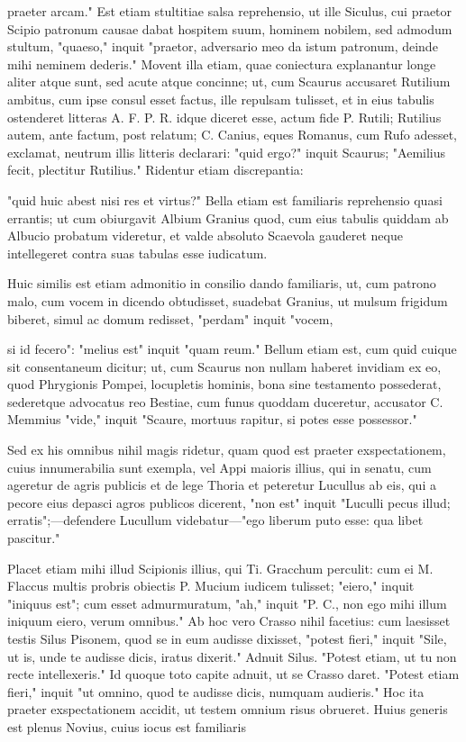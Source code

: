  praeter arcam." Est etiam stultitiae salsa reprehensio, ut ille Siculus, cui praetor Scipio patronum causae dabat hospitem suum, hominem nobilem, sed admodum stultum, "quaeso," inquit "praetor, adversario meo da istum patronum, deinde mihi neminem dederis." Movent illa etiam, quae coniectura explanantur longe aliter atque sunt, sed acute atque concinne; ut, cum Scaurus accusaret Rutilium ambitus, cum ipse consul esset factus, ille repulsam tulisset, et in eius tabulis ostenderet litteras A. F. P. R. idque diceret esse, actum fide P. Rutili; Rutilius autem, ante factum, post relatum; C. Canius, eques Romanus, cum Rufo adesset, exclamat, neutrum illis litteris declarari: "quid ergo?" inquit Scaurus; "Aemilius fecit, plectitur Rutilius." Ridentur etiam discrepantia:

 "quid huic abest nisi res et virtus?" Bella etiam est familiaris reprehensio quasi errantis; ut cum obiurgavit Albium Granius quod, cum eius tabulis quiddam ab Albucio probatum videretur, et valde absoluto Scaevola gauderet neque intellegeret contra suas tabulas esse iudicatum.

 Huic similis est etiam admonitio in consilio dando familiaris, ut, cum patrono malo, cum vocem in dicendo obtudisset, suadebat Granius, ut mulsum frigidum biberet, simul ac domum redisset, "perdam" inquit "vocem,

 si id fecero": "melius est" inquit "quam reum." Bellum etiam est, cum quid cuique sit consentaneum dicitur; ut, cum Scaurus non nullam haberet invidiam ex eo, quod Phrygionis Pompei, locupletis hominis, bona sine testamento possederat, sederetque advocatus reo Bestiae, cum funus quoddam duceretur, accusator C. Memmius "vide," inquit "Scaure, mortuus rapitur, si potes esse possessor."

 Sed ex his omnibus nihil magis ridetur, quam quod est praeter exspectationem, cuius innumerabilia sunt exempla, vel Appi maioris illius, qui in senatu, cum ageretur de agris publicis et de lege Thoria et peteretur Lucullus ab eis, qui a pecore eius depasci agros publicos dicerent, "non est" inquit "Luculli pecus illud; erratis";—defendere Lucullum videbatur—"ego liberum puto esse: qua libet pascitur."

 Placet etiam mihi illud Scipionis illius, qui Ti. Gracchum perculit: cum ei M. Flaccus multis probris obiectis P. Mucium iudicem tulisset; "eiero," inquit "iniquus est"; cum esset admurmuratum, "ah," inquit "P. C., non ego mihi illum iniquum eiero, verum omnibus." Ab hoc vero Crasso nihil facetius: cum laesisset testis Silus Pisonem, quod se in eum audisse dixisset, "potest fieri," inquit "Sile, ut is, unde te audisse dicis, iratus dixerit." Adnuit Silus. "Potest etiam, ut tu non recte intellexeris." Id quoque toto capite adnuit, ut se Crasso daret. "Potest etiam fieri," inquit "ut omnino, quod te audisse dicis, numquam audieris." Hoc ita praeter exspectationem accidit, ut testem omnium risus obrueret. Huius generis est plenus Novius, cuius iocus est familiaris

